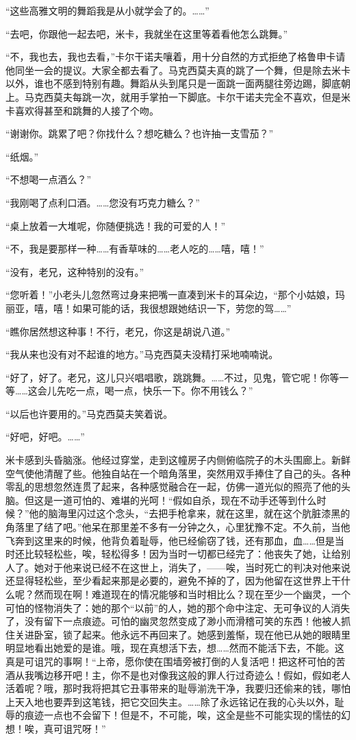 \par “这些高雅文明的舞蹈我是从小就学会了的。……”
\par “去吧，你跟他一起去吧，米卡，我就坐在这里等着看他怎么跳舞。”
\par “不，我也去，我也去看，”卡尔干诺夫嚷着，用十分自然的方式拒绝了格鲁申卡请他同坐一会的提议。大家全都去看了。马克西莫夫真的跳了一个舞，但是除去米卡以外，谁也不感到特别有趣。舞蹈从头到尾只是一面跳一面两腿往旁边踢，脚底朝上。马克西莫夫每跳一次，就用手掌拍一下脚底。卡尔干诺夫完全不喜欢，但是米卡喜欢得甚至和跳舞的人接了个吻。
\par “谢谢你。跳累了吧？你找什么？想吃糖么？也许抽一支雪茄？”
\par “纸烟。”
\par “不想喝一点酒么？”
\par “我刚喝了点利口酒。……您没有巧克力糖么？”
\par “桌上放着一大堆呢，你随便挑选！我的可爱的人！”
\par “不，我是要那样一种……有香草味的……老人吃的……嘻，嘻！”
\par “没有，老兄，这种特别的没有。”
\par “您听着！”小老头儿忽然弯过身来把嘴一直凑到米卡的耳朵边，“那个小姑娘，玛丽亚，嘻，嘻！如果可能的话，我很想跟她结识一下，劳您的驾……”
\par “瞧你居然想这种事！不行，老兄，你这是胡说八道。”
\par “我从来也没有对不起谁的地方。”马克西莫夫没精打采地喃喃说。
\par “好了，好了。老兄，这儿只兴唱唱歌，跳跳舞。……不过，见鬼，管它呢！你等一等……这会儿先吃一点，喝一点，快乐一下。你不用钱么？”
\par “以后也许要用的。”马克西莫夫笑着说。
\par “好吧，好吧。……”
\par 米卡感到头昏脑涨。他经过穿堂，走到这幢房子内侧俯临院子的木头围廊上。新鲜空气使他清醒了些。他独自站在一个暗角落里，突然用双手捧住了自己的头。各种零乱的思想忽然连贯了起来，各种感觉融合在一起，仿佛一道光似的照亮了他的头脑。但这是一道可怕的、难堪的光呵！“假如自杀，现在不动手还等到什么时候？”他的脑海里闪过这个念头，“去把手枪拿来，就在这里，就在这个肮脏漆黑的角落里了结了吧。”他呆在那里差不多有一分钟之久，心里犹豫不定。不久前，当他飞奔到这里来的时候，他背负着耻辱，他已经偷窃了钱，还有那血，血……但是当时还比较轻松些，唉，轻松得多！因为当时一切都已经完了：他丧失了她，让给别人了。她对于他来说已经不在这世上，消失了，——唉，当时死亡的判决对他来说还显得轻松些，至少看起来那是必要的，避免不掉的了，因为他留在这世界上干什么呢？然而现在啊！难道现在的情况能够和当时相比么？现在至少一个幽灵，一个可怕的怪物消失了：她的那个“以前”的人，她的那个命中注定、无可争议的人消失了，没有留下一点痕迹。可怕的幽灵忽然变成了渺小而滑稽可笑的东西！他被人抓住关进卧室，锁了起来。他永远不再回来了。她感到羞惭，现在他已从她的眼睛里明显地看出她爱的是谁。哦，现在真想活下去，想……然而不能活下去，不能。这真是可诅咒的事啊！“上帝，愿你使在围墙旁被打倒的人复活吧！把这杯可怕的苦酒从我嘴边移开吧！主，你不是也对像我这般的罪人行过奇迹么！假如，假如老人活着呢？哦，那时我将把其它丑事带来的耻辱湔洗干净，我要归还偷来的钱，哪怕上天入地也要弄到这笔钱，把它交回失主。……除了永远铭记在我的心头以外，耻辱的痕迹一点也不会留下！但是不，不可能，唉，这全是些不可能实现的懦怯的幻想！唉，真可诅咒呀！”
